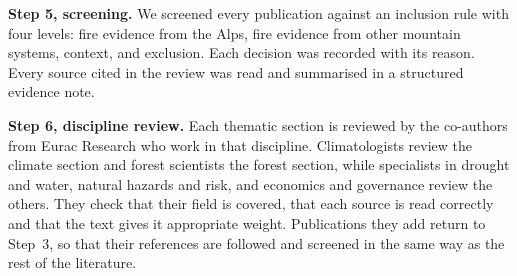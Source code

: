 \documentclass[11pt,a4paper]{article}
\begin{document}
\textbf{Step 5, screening.} We screened every publication against an inclusion rule with four levels: fire evidence from the Alps, fire evidence from other mountain systems, context, and exclusion. Each decision was recorded with its reason. Every source cited in the review was read and summarised in a structured evidence note.

\textbf{Step 6, discipline review.} Each thematic section is reviewed by the co-authors from Eurac Research who work in that discipline. Climatologists review the climate section and forest scientists the forest section, while specialists in drought and water, natural hazards and risk, and economics and governance review the others. They check that their field is covered, that each source is read correctly and that the text gives it appropriate weight. Publications they add return to Step~3, so that their references are followed and screened in the same way as the rest of the literature.
\end{document}
